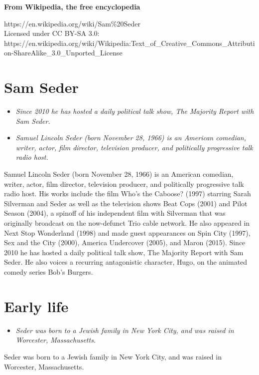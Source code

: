 \textbf{From Wikipedia, the free encyclopedia}

https://en.wikipedia.org/wiki/Sam\%20Seder\\
Licensed under CC BY-SA 3.0:\\
https://en.wikipedia.org/wiki/Wikipedia:Text\_of\_Creative\_Commons\_Attribution-ShareAlike\_3.0\_Unported\_License

\section{Sam Seder}\label{sam-seder}

\begin{itemize}
\item
  \emph{Since 2010 he has hosted a daily political talk show, The
  Majority Report with Sam Seder.}
\item
  \emph{Samuel Lincoln Seder (born November 28, 1966) is an American
  comedian, writer, actor, film director, television producer, and
  politically progressive talk radio host.}
\end{itemize}

Samuel Lincoln Seder (born November 28, 1966) is an American comedian,
writer, actor, film director, television producer, and politically
progressive talk radio host. His works include the film Who's the
Caboose? (1997) starring Sarah Silverman and Seder as well as the
television shows Beat Cops (2001) and Pilot Season (2004), a spinoff of
his independent film with Silverman that was originally broadcast on the
now-defunct Trio cable network. He also appeared in Next Stop Wonderland
(1998) and made guest appearances on Spin City (1997), Sex and the City
(2000), America Undercover (2005), and Maron (2015). Since 2010 he has
hosted a daily political talk show, The Majority Report with Sam Seder.
He also voices a recurring antagonistic character, Hugo, on the animated
comedy series Bob's Burgers.

\section{Early life}\label{early-life}

\begin{itemize}
\item
  \emph{Seder was born to a Jewish family in New York City, and was
  raised in Worcester, Massachusetts.}
\end{itemize}

Seder was born to a Jewish family in New York City, and was raised in
Worcester, Massachusetts.

